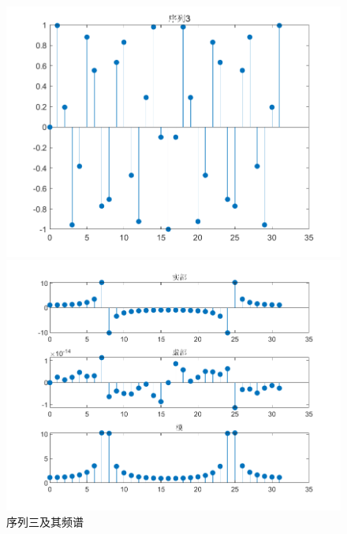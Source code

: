 \documentclass{../source/zjureport}
\begin{document}
            \begin{figure}[H]
                \centering
                \begin{minipage}[t]{0.48\textwidth}
                \centering
                \includegraphics[width=\textwidth]{figure/序列3.png}
                \end{minipage}
                \begin{minipage}[t]{0.48\textwidth}
                \centering
                \includegraphics[width=\textwidth]{figure/频谱_序列3.png}
                \end{minipage}
                \caption{序列三及其频谱}
            \end{figure}
\end{document}

